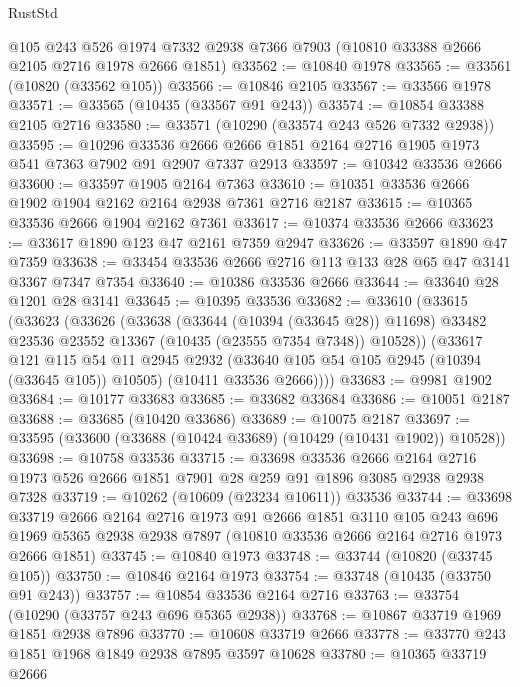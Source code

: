 \begin{lexlean}{RustStd}
\begin{coremodule}
    @105
    @243
    @526
    @1974
    @7332
    @2938
    @7366
    @7903
    (@10810 @33388 @2666 @2105 @2716 @1978 @2666 @1851)
@33562 := @10840 @1978
@33565 := @33561 (@10820 (@33562 @105))
@33566 := @10846 @2105
@33567 := @33566 @1978
@33571 := @33565 (@10435 (@33567 @91 @243))
@33574 := @10854 @33388 @2105 @2716
@33580 := @33571 (@10290 (@33574 @243 @526 @7332 @2938))
@33595 := @10296
    @33536
    @2666
    @2666
    @1851
    @2164
    @2716
    @1905
    @1973
    @541
    @7363
    @7902
    @91
    @2907
    @7337
    @2913
@33597 := @10342 @33536 @2666
@33600 := @33597 @1905 @2164 @7363
@33610 := @10351 @33536 @2666 @1902 @1904 @2162 @2164 @2938 @7361 @2716 @2187
@33615 := @10365 @33536 @2666 @1904 @2162 @7361
@33617 := @10374 @33536 @2666
@33623 := @33617 @1890 @123 @47 @2161 @7359 @2947
@33626 := @33597 @1890 @47 @7359
@33638 := @33454 @33536 @2666 @2716 @113 @133 @28 @65 @47 @3141 @3367 @7347 @7354
@33640 := @10386 @33536 @2666
@33644 := @33640 @28 @1201 @28 @3141
@33645 := @10395 @33536
@33682 := @33610
    (@33615
      (@33623
        (@33626
          (@33638
            (@33644 (@10394 (@33645 @28)) @11698)
            @33482
            @23536
            @23552
            @13367
            (@10435 (@23555 @7354 @7348))
            @10528))
        (@33617
          @121
          @115
          @54
          @11
          @2945
          @2932
          (@33640 @105 @54 @105 @2945 (@10394 (@33645 @105)) @10505)
          (@10411 @33536 @2666))))
@33683 := @9981 @1902
@33684 := @10177 @33683
@33685 := @33682 @33684
@33686 := @10051 @2187
@33688 := @33685 (@10420 @33686)
@33689 := @10075 @2187
@33697 := @33595 (@33600 (@33688 (@10424 @33689) (@10429 (@10431 @1902)) @10528))
@33698 := @10758 @33536
@33715 := @33698
    @33536
    @2666
    @2164
    @2716
    @1973
    @526
    @2666
    @1851
    @7901
    @28
    @259
    @91
    @1896
    @3085
    @2938
    @2938
    @7328
@33719 := @10262 (@10609 (@23234 @10611)) @33536
@33744 := @33698
    @33719
    @2666
    @2164
    @2716
    @1973
    @91
    @2666
    @1851
    @3110
    @105
    @243
    @696
    @1969
    @5365
    @2938
    @2938
    @7897
    (@10810 @33536 @2666 @2164 @2716 @1973 @2666 @1851)
@33745 := @10840 @1973
@33748 := @33744 (@10820 (@33745 @105))
@33750 := @10846 @2164 @1973
@33754 := @33748 (@10435 (@33750 @91 @243))
@33757 := @10854 @33536 @2164 @2716
@33763 := @33754 (@10290 (@33757 @243 @696 @5365 @2938))
@33768 := @10867 @33719 @1969 @1851 @2938 @7896
@33770 := @10608 @33719 @2666
@33778 := @33770 @243 @1851 @1968 @1849 @2938 @7895 @3597 @10628
@33780 := @10365 @33719 @2666

\end{coremodule}
\end{lexlean}
